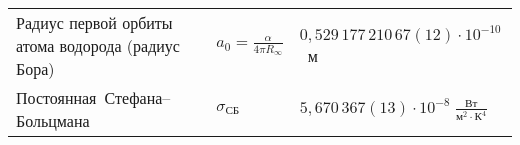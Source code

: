 \begin{labsupplement}
\begin{longtable}{p{46mm}>{\centering}p{14mm}p{45mm}}
\bigstrut[t] Радиус первой орбиты\newline
атома водорода (радиус Бора)
                 & $a_0 = \frac{\alpha}{4\pi R_{\infty}}$
                 & $0,529\,177\,210\,67(12)\cdot 10^{-10}$~м            \\
\mbox{Постоянная Стефана--Больцмана}
                 & $\sigma_{СБ}$
                 & $5,670\,367(13)\cdot 10^{-8}\;\frac{Вт}{м^2\cdot К^4}$ \\
\bottomrule[1pt]
\end{longtable}


\end{labsupplement}
